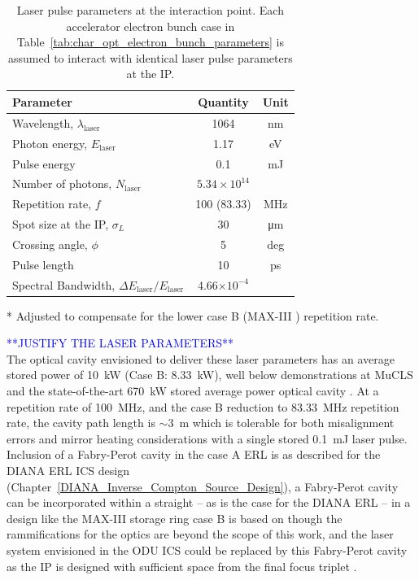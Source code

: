 \documentclass[../main.tex]{subfiles}
\begin{document}
\begin{table}[!h]
\centering
\caption{Laser pulse parameters at the interaction point. Each accelerator electron bunch case in Table~\ref{tab:char_opt_electron_bunch_parameters} is assumed to interact with identical laser pulse parameters at the IP.}
\begin{threeparttable}
\begin{tabular}{lcc}
\hline\hline
Parameter & Quantity & Unit \\
\hline
Wavelength, $\lambda_\textrm{laser}$ & 1064 & nm\\
Photon energy, $E_\textrm{laser}$ & 1.17 & eV\\
Pulse energy  & 0.1 & \si{\milli\joule}\\
Number of photons, $N_{\textrm{laser}}$ & $5.34\times 10^{14}$\\ 
Repetition rate, $f$ & 100 (83.33)\tnote{*} & MHz\\
Spot size at the IP, $\sigma_{L}$ & 30 & \si{\micro\meter}\\
Crossing angle, $\phi$ & 5 & deg \\
Pulse length  & 10 & ps\\
Spectral Bandwidth, $\Delta E_\textrm{laser}/E_\textrm{laser}$ & 4.66$\times 10^{-4}$ &   \\
\hline\hline
\end{tabular}
\begin{tablenotes}
\item[*]{Adjusted to compensate for the lower case B (MAX-III \cite{sjostrom2009max,rosborg2012electron}) repetition rate.}
\end{tablenotes}
\end{threeparttable}
\label{tab:char_opt_laser_pulse_parameters}
\end{table}

\textcolor{blue}{**JUSTIFY THE LASER PARAMETERS**\\}
The optical cavity envisioned to deliver these laser parameters has an average stored power of 10~\si{\kilo\watt} (Case B: 8.33~\si{\kilo\watt}), well below demonstrations at MuCLS \cite{eggl2016munich} and the state-of-the-art 670~\si{\kilo\watt} stored average power optical cavity \cite{carstens2014megawatt}. At a repetition rate of 100~\si{\mega\hertz}, and the case B reduction to 83.33~\si{\mega\hertz} repetition rate, the cavity path length is $\sim3$~\si{\meter} which is tolerable for both misalignment errors and mirror heating considerations with a single stored 0.1~\si{\milli\joule} laser pulse. Inclusion of a Fabry-Perot cavity in the case A ERL is as described for the DIANA ERL ICS design (Chapter~\ref{DIANA_Inverse_Compton_Source_Design}), a Fabry-Perot cavity can be incorporated within a straight -- as is the case for the DIANA ERL -- in a design like the MAX-III storage ring case B is based on though the rammifications for the optics are beyond the scope of this work, and the laser system envisioned in the ODU ICS could be replaced by this Fabry-Perot cavity as the IP is designed with sufficient space from the final focus triplet \cite{deitrick2018high}.    
\end{document}
